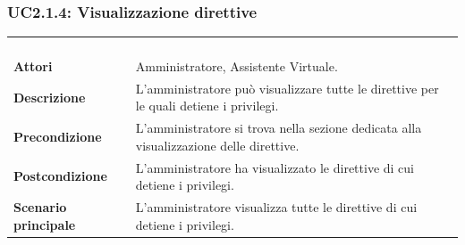 \subsubsection{UC2.1.4: Visualizzazione direttive }
\label{UC2.1.4}
\begin{longtable}{l|p{10cm}}
\rowcolor[gray]{0.8} \multicolumn{2}{c}{} \\
\rowcolor[gray]{0.8} \multicolumn{2}{c}{\textbf{UC2.1.4 - Visualizzazione direttive }} \\
\rowcolor[gray]{0.8} \multicolumn{2}{c}{} \\
\hline
&\\
\textbf{Attori} & Amministratore, Assistente Virtuale.\\[7pt]
\textbf{Descrizione} & L'amministratore può visualizzare tutte le direttive per le quali detiene i privilegi.\\[7pt]
\textbf{Precondizione} & L'amministratore si trova nella sezione dedicata alla visualizzazione delle direttive.\\[7pt]
\textbf{Postcondizione} & L'amministratore ha visualizzato le direttive di cui detiene i privilegi.\\[7pt]
\textbf{Scenario principale} &L'amministratore visualizza tutte le direttive di cui detiene i privilegi.\\[7pt]\hline
\end{longtable}

